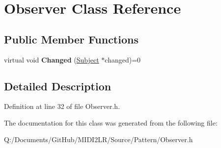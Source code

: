 \hypertarget{class_observer}{}\section{Observer Class Reference}
\label{class_observer}
\subsection*{Public Member Functions}
\begin{DoxyCompactItemize}
\item 
virtual void {\bfseries Changed} (\hyperlink{class_subject}{Subject} $\ast$changed)=0\hypertarget{class_observer_a04804fdd8d8f8e58878346df139f7cfd}{}\label{class_observer_a04804fdd8d8f8e58878346df139f7cfd}

\end{DoxyCompactItemize}


\subsection{Detailed Description}


Definition at line 32 of file Observer.\+h.



The documentation for this class was generated from the following file\+:\begin{DoxyCompactItemize}
\item 
Q\+:/\+Documents/\+Git\+Hub/\+M\+I\+D\+I2\+L\+R/\+Source/\+Pattern/Observer.\+h\end{DoxyCompactItemize}
